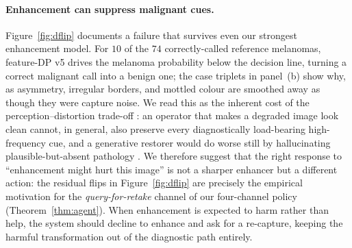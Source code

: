 

\paragraph{Enhancement can suppress malignant cues.}
Figure~\ref{fig:dflip} documents a failure that survives even our strongest
enhancement model. For $10$ of the $74$ correctly-called reference melanomas,
feature-DP \visienhance{} v5 drives the melanoma probability below the decision
line, turning a correct malignant call into a benign one; the case triplets in
panel~(b) show why, as asymmetry, irregular borders, and mottled colour are
smoothed away as though they were capture noise. We read this as the inherent
cost of the perception--distortion trade-off \citep{blau2018perception}: an
operator that makes a degraded image look clean cannot, in general, also
preserve every diagnostically load-bearing high-frequency cue, and a generative
restorer would do worse still by hallucinating plausible-but-absent pathology
\citep{cohen2018distribution}. We therefore suggest that the right response to
``enhancement might hurt this image'' is not a sharper enhancer but a different
action: the residual flips in Figure~\ref{fig:dflip} are precisely the empirical
motivation for the \emph{query-for-retake} channel of our four-channel policy
(Theorem~\ref{thm:agent}). When enhancement is expected to harm rather than help,
the system should decline to enhance and ask for a re-capture, keeping the
harmful transformation out of the diagnostic path entirely.

